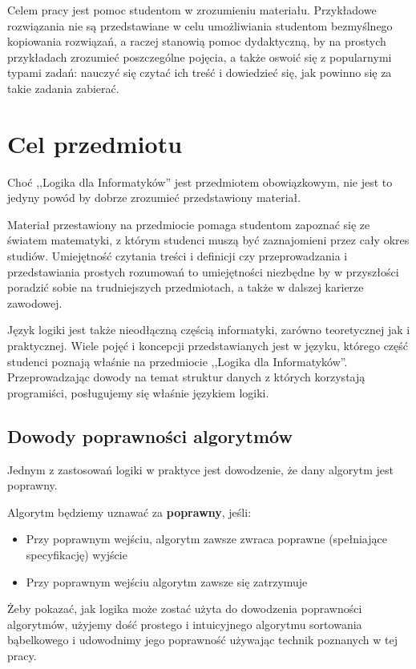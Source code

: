 Celem pracy jest pomoc studentom w zrozumieniu materiału. Przykładowe rozwiązania nie są przedstawiane w celu umożliwiania studentom bezmyślnego kopiowania rozwiązań, a raczej stanowią pomoc dydaktyczną, by na prostych przykładach zrozumieć poszczególne pojęcia, a także oswoić się z popularnymi typami zadań: nauczyć się czytać ich treść i dowiedzieć się, jak powinno się za takie zadania zabierać. 

\section{Cel przedmiotu}
Choć ,,Logika dla Informatyków'' jest przedmiotem obowiązkowym, nie jest to jedyny powód by dobrze zrozumieć przedstawiony materiał.

Materiał przestawiony na przedmiocie pomaga studentom zapoznać się ze światem matematyki, z którym studenci muszą być zaznajomieni przez cały okres studiów. Umiejętność czytania treści i definicji czy przeprowadzania i przedstawiania prostych rozumowań to umiejętności niezbędne by w przyszłości poradzić sobie na trudniejszych przedmiotach, a także w dalszej karierze zawodowej. 

Język logiki jest także nieodłączną częścią informatyki, zarówno teoretycznej jak i praktycznej. Wiele pojęć i koncepcji przedstawianych jest w języku, którego część studenci poznają właśnie na przedmiocie ,,Logika dla Informatyków''. Przeprowadzając dowody na temat struktur danych z których korzystają programiści, posługujemy się właśnie językiem logiki.

\subsection{Dowody poprawności algorytmów}

Jednym z zastosowań logiki w praktyce jest dowodzenie, że dany algorytm jest poprawny. 

Algorytm będziemy uznawać za \textbf{poprawny}, jeśli:

\begin{itemize}
    \item Przy poprawnym wejściu, algorytm zawsze zwraca poprawne (spełniające specyfikację) wyjście
    \item Przy poprawnym wejściu algorytm zawsze się zatrzymuje
\end{itemize}

Żeby pokazać, jak logika może zostać użyta do dowodzenia poprawności algorytmów, użyjemy dość prostego i intuicyjnego algorytmu sortowania bąbelkowego i udowodnimy jego poprawność używając technik poznanych w tej pracy.
\clearpage

